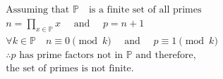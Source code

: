 $$
\begin{aligned}
&\text{Assuming that $\mathbb{P}$ }\text{ is a finite set of all primes} \\
&n = \prod_{x \in \mathbb{P}}^{} x \quad \text{ and } \quad p = n+1 \\
&\forall k  \in \mathbb{P} \quad n \equiv 0 \pmod{k} \quad \text{ and } \quad p \equiv 1 \pmod{k} \\
&\therefore p \text{ has prime factors not in } \mathbb{P} \text{ and therefore, } \\
&\text{the set of primes is not finite.}
\end{aligned}
$$
